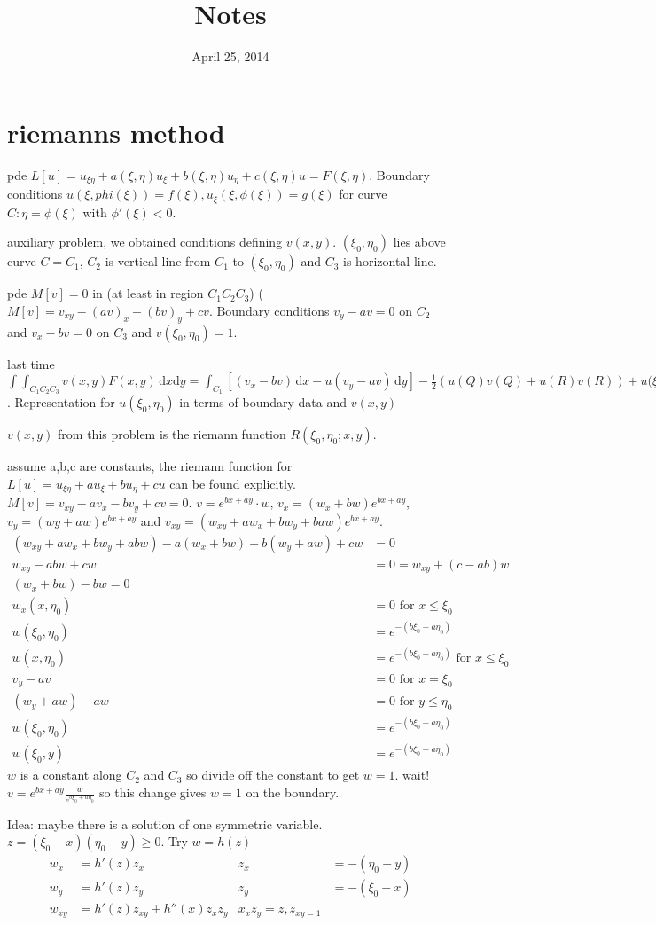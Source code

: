 \documentclass{article}
\begin{document}
\title{Notes}
\date{April 25, 2014}
\maketitle
\section*{riemanns method}
pde $L[u]=u_{\xi\eta}+a(\xi,\eta)u_\xi+b(\xi,\eta)u_\eta+c(\xi,\eta)u=F(\xi,\eta)$.  Boundary conditions $u(\xi,phi(\xi))=f(\xi), u_\xi(\xi,\phi(\xi))=g(\xi)$ for curve $C:\eta=\phi(\xi)$ with $\phi'(\xi)<0$.

auxiliary problem, we obtained conditions defining $v(x,y)$. $(\xi_0,\eta_0)$ lies above curve $C=C_1$, $C_2$ is vertical line from $C_1$ to $(\xi_0,\eta_0)$ and $C_3$ is horizontal line.

pde $M[v]=0$ in (at least in region $C_1C_2C_3$) ($M[v]=v_{xy}-(av)_x-(bv)_y+cv$. Boundary conditions $v_y-av=0$ on $C_2$ and $v_x-bv=0$ on $C_3$ and $v(\xi_0,\eta_0)=1$.

last time $\int\int_{C_1C_2C_3}{v(x,y)F(x,y)\,\mathrm{d}x\mathrm{d}y}=\int_{C_1}{\left[(v_x-bv)\,\mathrm{d}x-u(v_y-av)\,\mathrm{d}y\right]}-\frac{1}{2}\left(u(Q)v(Q)+u(R)v(R)\right)+u(\xi_0,\eta_0$. Representation for $u(\xi_0,\eta_0)$ in terms of boundary data and $v(x,y)$

$v(x,y)$ from this problem is the riemann function $R(\xi_0,\eta_0;x,y)$. 

assume a,b,c are constants, the riemann function for $L[u]=u_{\xi\eta}+au_\xi+bu_\eta+cu$ can be found explicitly. $M[v]=v_{xy}-av_x-bv_y+cv=0$. $v=e^{bx+ay}\cdot w$, $v_x=(w_x+bw)e^{bx+ay}$, $v_y=(wy+aw)e^{bx+ay}$ and $v_{xy}=(w_{xy}+aw_x+bw_y+baw)e^{bx+ay}$.
\begin{align*}
  (w_{xy}+aw_x+bw_y+abw)-a(w_x+bw)-b(w_y+aw)+cw&=0\\
  w_{xy}-abw+cw&=0=w_{xy}+(c-ab)w\\
  (w_x+bw)-bw=0\\
  w_x(x,\eta_0)&=0\text{ for }x\le\xi_0\\
  w(\xi_0,\eta_0)&=e^{-(b\xi_0+a\eta_0)}\\
  w(x,\eta_0)&=e^{-(b\xi_0+a\eta_0)}\text{ for }x\le\xi_0\\
  v_y-av&=0\text{ for }x=\xi_0\\
  (w_y+aw)-aw&=0\text{ for }y\le\eta_0\\
  w(\xi_0,\eta_0)&=e^{-(b\xi_0+a\eta_0)}\\
  w(\xi_0,y)&=e^{-(b\xi_0+a\eta_0)}
\end{align*}
$w$ is a constant along $C_2$ and $C_3$ so divide off the constant to get $w=1$. wait! $v=e^{bx+ay}\frac{w}{e^{b\xi_0+a\eta_0}}$ so this change gives $w=1$ on the boundary.

Idea: maybe there is a solution of one symmetric variable. $z=(\xi_0-x)(\eta_0-y)\ge0$. Try  $w=h(z)$
\begin{align*}
  w_x&=h'(z)z_x&z_x&=-(\eta_0-y)\\
  w_y&=h'(z)z_y&z_y&=-(\xi_0-x)\\
  w_{xy}&=h'(z)z_{xy}+h''(x)z_xz_y&x_xz_y=z,z_{xy=1}\\
\end{align*}
\end{document}
